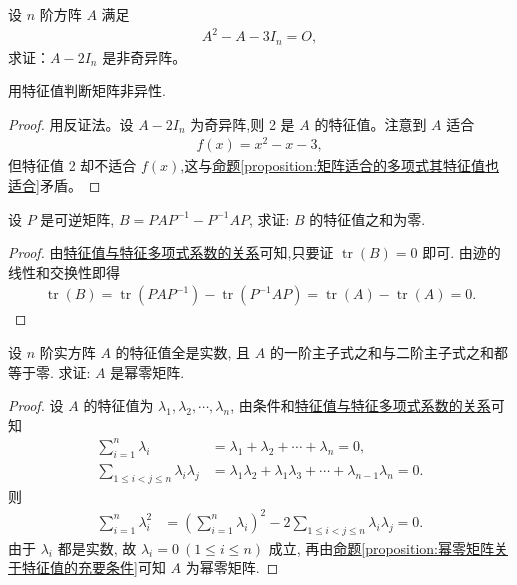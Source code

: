 \documentclass[../../main.tex]{subfiles}%
\begin{document}
\begin{example}
设 \(n\) 阶方阵 \(A\) 满足 
\begin{align*}
A^2 - A - 3I_n = O,
\end{align*}
求证：\(A - 2I_n\) 是非奇异阵。
\end{example}
\begin{note}
用特征值判断矩阵非异性.
\end{note}
\begin{proof}

用反证法。设 \(A - 2I_n\) 为奇异阵,则 2 是 \(A\) 的特征值。注意到 \(A\) 适合 
\begin{align*}
f(x) = x^2 - x - 3,
\end{align*}
但特征值 2 却不适合 \(f(x)\),这与\hyperref[proposition:矩阵适合的多项式其特征值也适合]{命题\ref{proposition:矩阵适合的多项式其特征值也适合}}矛盾。

\end{proof}

\begin{example}
设 $P$ 是可逆矩阵, $B = PAP^{-1} - P^{-1}AP$, 求证: $B$ 的特征值之和为零.
\end{example}
\begin{proof}

由\hyperref[proposition:特征值与特征多项式系数的关系]{特征值与特征多项式系数的关系}可知,只要证 $\operatorname{tr}(B) = 0$ 即可. 由迹的线性和交换性即得
\begin{align*}
\operatorname{tr}(B) = \operatorname{tr}(PAP^{-1}) - \operatorname{tr}(P^{-1}AP) 
= \operatorname{tr}(A) - \operatorname{tr}(A) = 0.
\end{align*}

\end{proof}

\begin{example}
设 $n$ 阶实方阵 $A$ 的特征值全是实数, 且 $A$ 的一阶主子式之和与二阶主子式之和都等于零. 求证: $A$ 是幂零矩阵.
\end{example}
\begin{proof}

设 $A$ 的特征值为 $\lambda_1, \lambda_2, \cdots, \lambda_n$, 由条件和\hyperref[proposition:特征值与特征多项式系数的关系]{特征值与特征多项式系数的关系}可知
\begin{align*}
\sum_{i=1}^n \lambda_i &= \lambda_1 + \lambda_2 + \cdots + \lambda_n = 0, \\
\sum_{1 \leqslant  i < j \leqslant  n} \lambda_i \lambda_j &= \lambda_1 \lambda_2 + \lambda_1 \lambda_3 + \cdots + \lambda_{n-1} \lambda_n = 0.
\end{align*}
则
\begin{align*}
\sum_{i=1}^n \lambda_i^2 &= \left( \sum_{i=1}^n \lambda_i \right)^2 - 2 \sum_{1 \leqslant  i < j \leqslant  n} \lambda_i \lambda_j = 0.
\end{align*}
由于 $\lambda_i$ 都是实数, 故 $\lambda_i = 0 \ (1 \leqslant  i \leqslant  n)$ 成立, 再由\hyperref[proposition:幂零矩阵关于特征值的充要条件]{命题\ref{proposition:幂零矩阵关于特征值的充要条件}}可知 $A$ 为幂零矩阵.

\end{proof}
\end{document}
